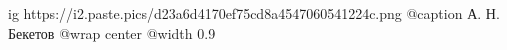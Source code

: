  
 
 
 
 

\ifcmt
	ig https://i2.paste.pics/d23a6d4170ef75cd8a4547060541224c.png
	@caption А. Н. Бекетов
  @wrap center
  @width 0.9
\fi
